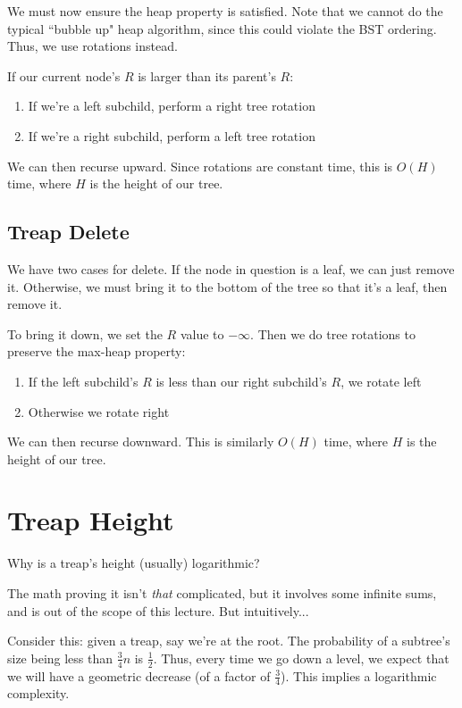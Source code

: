 \documentclass[11pt]{article}
\begin{document}
    We must now ensure the heap property is satisfied. Note that we cannot do the typical ``bubble up" heap algorithm, since this could violate the BST ordering. Thus, we use rotations instead.
    
    If our current node's $R$ is larger than its parent's $R$:
    
    \begin{enumerate}
        \item If we're a left subchild, perform a right tree rotation
        \item If we're a right subchild, perform a left tree rotation
    \end{enumerate}
    
    We can then recurse upward. Since rotations are constant time, this is $O(H)$ time, where $H$ is the height of our tree.
    
\subsection{Treap Delete}
    We have two cases for delete. If the node in question is a leaf, we can just remove it. Otherwise, we must bring it to the bottom of the tree so that it's a leaf, then remove it.
    
    To bring it down, we set the $R$ value to $-\infty$. Then we do tree rotations to preserve the max-heap property:
    
    \begin{enumerate}
        \item If the left subchild's $R$ is less than our right subchild's $R$, we rotate left
        \item Otherwise we rotate right
    \end{enumerate}
    
    We can then recurse downward. This is similarly $O(H)$ time, where $H$ is the height of our tree.
    
\section{Treap Height}
    Why is a treap's height (usually) logarithmic?
    
    The math proving it isn't \textit{that} complicated, but it involves some infinite sums, and is out of the scope of this lecture. But intuitively...
    
    Consider this: given a treap, say we're at the root. The probability of a subtree's size being less than $\frac{3}{4}n$ is $\frac{1}{2}$. Thus, every time we go down a level, we expect that we will have a geometric decrease (of a factor of $\frac{3}{4}$). This implies a logarithmic complexity.
    
\end{document}
